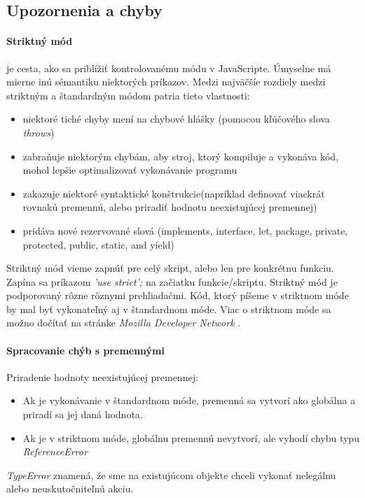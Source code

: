 \subsection{Upozornenia a chyby}

\paragraph{Striktný mód} je cesta, ako sa priblížiť kontrolovanému módu v JavaScripte. Úmyselne má mierne inú sémantiku niektorých príkazov. Medzi najväčšíe rozdiely medzi striktným a štandardným módom patria tieto vlastnosti:
\begin{itemize}
  \item niektoré tiché chyby mení na chybové hlášky (pomocou kľúčového slova \emph{throws})
  \item zabraňuje niektorým chybám, aby stroj, ktorý kompiluje a vykonáva kód, mohol lepšie optimalizovať vykonávanie programu
  \item zakazuje niektoré syntaktické konštrukcie(napríklad definovať viackrát rovnakú premennú, alebo priradiť hodnotu neexistujúcej premennej)
  \item pridáva nové rezervované slová (implements, interface, let, package, private, protected, public, static, and yield)
\end{itemize}

Striktný mód vieme zapnúť pre celý skript, alebo len pre konkrétnu funkciu. Zapína sa príkazom \emph{'use strict';} na začiatku funkcie/skriptu.
Striktný mód je podporovaný rôzne rôznymi prehliadačmi. Kód, ktorý píšeme v striktnom móde by mal byť vykonateľný aj v štandardnom móde. Viac o striktnom móde sa možno dočítať na stránke \emph{Mozilla Developer Network} \cite{strict}.

\paragraph{Spracovanie chýb s premennými\\}
Priradenie hodnoty neexistujúcej premennej:
\begin{itemize}
\item Ak je vykonávanie v štandardnom móde, premenná sa vytvorí ako globálna a priradí sa jej daná hodnota.
\item Ak je v striktnom móde, globálnu premennú nevytvorí, ale vyhodí chybu typu \emph{ReferenceError}
\end{itemize}

\emph{TypeError} znamená, že sme na existujúcom objekte chceli vykonať nelegálnu alebo neuskutočniteľnú akciu.

